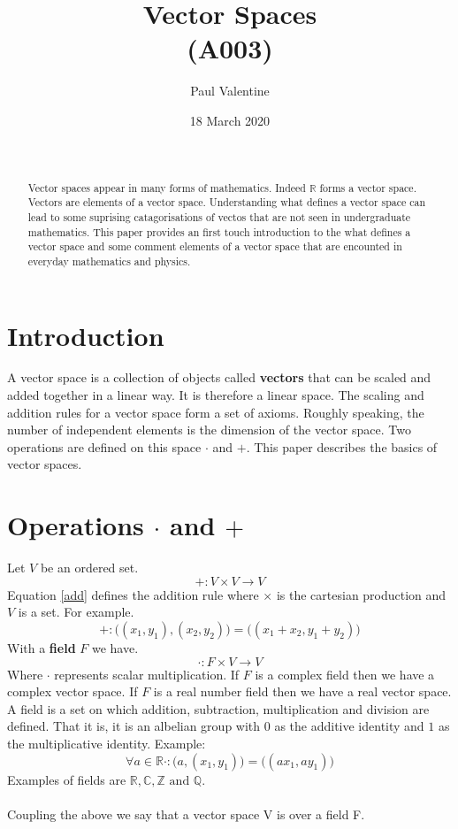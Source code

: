 \documentclass[a4paper]{article}
\title{\textbf{Vector Spaces}\\(A003)}
\author{Paul Valentine}
\date{18 March 2020}
\begin{document}
\maketitle
\begin{abstract}
  \\\ \\Vector spaces appear in many forms of mathematics. Indeed $\mathbb{R}$ forms a vector space. Vectors are elements of a vector space. Understanding what defines a vector space can lead to some suprising catagorisations of vectos that are not seen in undergraduate mathematics. This paper provides an first touch introduction to the what defines a vector space and some comment elements of a vector space that are encounted in everyday mathematics and physics.
\end{abstract}
\section{Introduction}
A vector space is a collection of objects called \textbf{vectors} that can be scaled and added together in a linear way. It is therefore a linear space. The scaling and addition rules for a vector space form a set of axioms. Roughly speaking, the number of independent elements is the dimension of the vector space. Two operations are defined on this space $\cdot$ and $+$. This paper describes the basics of vector spaces.
\section{Operations $\cdot$ and $+$}
Let $V$ be an ordered set.
\label{operations}
\begin{equation}
  \label{add}
  +:V \times V \to V
\end{equation}
Equation \ref{add} defines the addition rule where $\times$ is the cartesian production\cite{A002} and $V$ is a set. For example.
\begin{equation}
  +:\big((x_1, y_1),(x_2,y_2)\big) = \big((x_1+x_2,y_1+y_2)\big)
\end{equation}
 With a \textbf{field}\cite{wiki:mathfield} $F$ we have.
\begin{equation}
  \cdot : F \times V \to V
\end{equation}
Where $\cdot$ represents scalar multiplication. If $F$ is a complex field then we have a complex vector space. If $F$ is a real number field then we have a real vector space. A field is a set on which addition, subtraction, multiplication and division are defined. That it is, it is an albelian group with $0$ as the additive identity and $1$ as the multiplicative identity. Example:
\begin{equation}
\forall a\in \mathbb{R}  \cdot:\big(a,(x_1,y_1)\big) = \big((ax_1,ay_1)\big)
\end{equation}
Examples of fields are $\mathbb{R}, \mathbb{C}, \mathbb{Z} \text{ and } \mathbb{Q}$.\\ \\
Coupling the above we say that a vector space V is over a field F.
\end{document}
